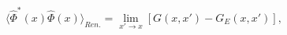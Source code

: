 \begin{equation}
\langle\hat{\Phi}^*(x)\hat{\Phi}(x)\rangle_{Ren.}=\lim_{x'\to x}\left[G(x,x')-
G_{E}(x,x')\right],
\label{25}
\end{equation}

